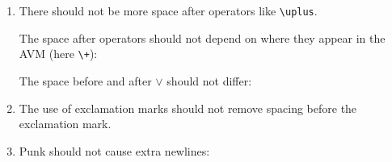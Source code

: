 \documentclass[output=book
		,modfonts
		,nonflat
	        ,collection
	        ,collectionchapter
	        ,collectiontoclongg
 	        ,biblatex  
                ,babelshorthands
                ,newtxmath
                ,colorlinks, citecolor=brown 
                ,draftmode
		  ]{langscibook}
\begin{document}
\begin{enumerate}
``Maybe what you really want isn't so much messing around with individual letters, but rather setting tighter options for the enclosing bracket delimiter, e.g.: \verb+\avm[delimfactor=950, delimfall=5pt] {}+.''

Interestingly the delimfactor does not seem to make a difference for simple AVMs like the ones in
(), but it does affect the ones at the very beginning.


\item 
There should not be more space after operators like \verb+\uplus+.


\ea
{}
\z

The space after operators should not depend on where they appear in the AVM (here \verb-\+-):
\ea
{}
\z



The space before and after $\lor$ should not differ:
\ea
{}
\z



\item 

The use of exclamation marks should not remove spacing before the exclamation mark.
\ea
{}
\z




\item 
Punk should not cause extra newlines:

\ea
{}
\z 


\end{enumerate}
\end{document}
